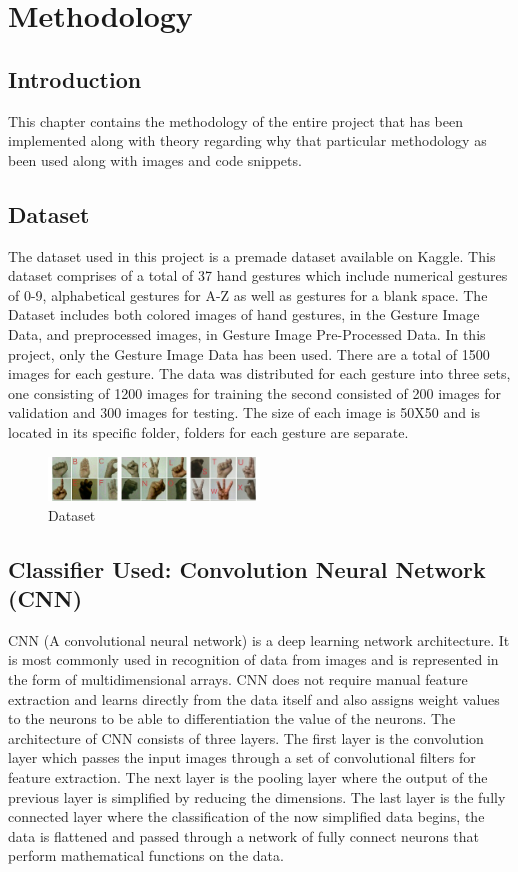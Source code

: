 \chapter{Methodology}
\section{Introduction}
This chapter contains the methodology of the entire project that has been implemented along with theory regarding why that particular methodology as been used along with images and code snippets.
\section{Dataset}
The dataset used in this project is a premade dataset available on Kaggle. This dataset comprises of a total of 37 hand gestures which include numerical gestures of 0-9, alphabetical gestures for A-Z as well as gestures for a blank space. The Dataset includes both colored images of hand gestures, in the Gesture Image Data, and preprocessed images, in Gesture Image Pre-Processed Data. In this project, only the Gesture Image Data has been used. There are a total of 1500 images for each gesture. The data was distributed for each gesture into three sets, one consisting of 1200 images for training the second consisted of 200 images for validation and 300 images for testing. The size of each image is 50X50 and is located in its specific folder, folders for each gesture are separate.
\begin{figure}[h!]
\centering
\includegraphics[width=0.5\textwidth]{dataset.jpg}
\caption{\label{fig:frog}Dataset}
\end{figure}

\section{Classifier Used: Convolution Neural Network (CNN)}
CNN (A convolutional neural network) is a deep learning network architecture. It is most commonly used in recognition of data from images and is represented in the form of multidimensional arrays. CNN does not require manual feature extraction and learns directly from the data itself and also assigns weight values to the neurons to be able to differentiation the value of the neurons. The architecture of CNN consists of three layers. The first layer is the convolution layer which passes the input images through a set of convolutional filters for feature extraction. The next layer is the pooling layer where the output of the previous layer is simplified by reducing the dimensions. The last layer is the fully connected layer where the classification of the now simplified data begins, the data is flattened and passed through a network of fully connect neurons that perform mathematical functions on the data. 

